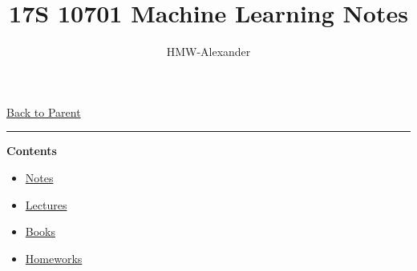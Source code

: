 \documentclass[letterpaper,11pt]{article}
\title{\textbf{17S 10701 Machine Learning Notes}}
\author{HMW-Alexander}
\newcommand{\panhline}{\begin{center}\rule{\textwidth}{1pt}\end{center}}
\begin{document}
\maketitle
\href{../index.html}{Back to Parent}

\panhline
\textbf{Contents}

\begin{itemize}
	\item \href{./Notes/index.html}{Notes}
	\item \href{./Lectures/index.html}{Lectures}
	\item \href{./Books/index.html}{Books}
	\item \href{./Homeworks/index.html}{Homeworks}
\end{itemize}
	
\end{document}
